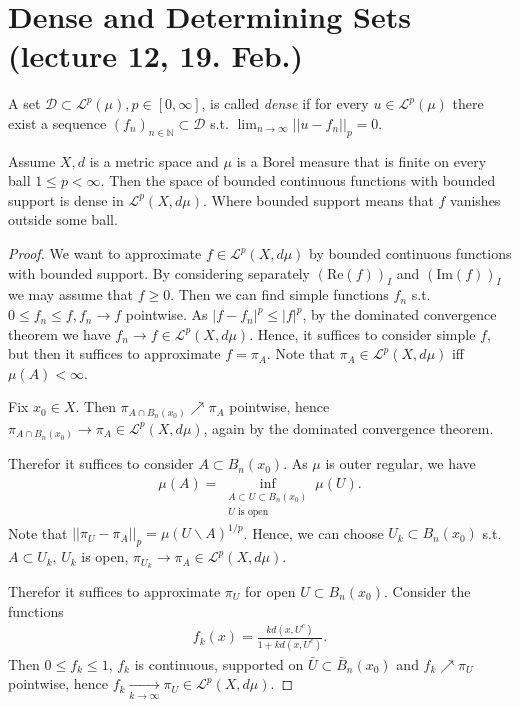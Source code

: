 \section{Dense and Determining Sets (lecture 12, 19. Feb.)}
\begin{definition}
    A set \(\mathcal{D}\subset\mathcal{L}^p(\mu), p\in[0,\infty]\), is called \emph{dense} if for every \(u\in\mathcal{L}^p(\mu)\) there exist
    a sequence \((f_n)_{n\in\mathbb{N}}\subset\mathcal{D}\) s.t. \(\lim_{n\rightarrow\infty}\vert\vert u-f_n\vert\vert_p=0\).
\end{definition}
\begin{theorem}
    Assume \(X,d\) is a metric space and \(\mu\) is a Borel measure that is finite on every ball \(1\leq p<\infty\). Then the space of 
    bounded continuous functions with bounded support is dense in \(\mathcal{L}^p(X,d\mu)\). Where bounded support means that \(f\) vanishes outside
    some ball.
\end{theorem}
\ifdetailed
\begin{proof}
    We want to approximate \(f\in\mathcal{L}^p(X,d\mu)\) by bounded continuous functions with bounded support. By considering separately 
    \((\text{Re}(f))_I\) and \((\text{Im}(f))_I\) we may assume that \(f\geq 0\). Then we can find simple functions \(f_n\) s.t. 
    \(0\leq f_n\leq f, f_n\rightarrow f\) pointwise. As \(\vert  f- f_n\vert^p \leq \vert f\vert^p\), by the dominated convergence theorem
    we have \(f_n\rightarrow f\in\mathcal{L}^p(X,d\mu)\). Hence, it suffices to consider simple \(f\), but then it suffices to approximate
    \(f=\pi_A\). Note that \(\pi_A\in\mathcal{L}^p(X,d\mu)\) iff \(\mu(A)<\infty\). 

    Fix \(x_0\in X\). Then \(\pi_{A\cap B_n(x_0)} \nearrow \pi_A\) pointwise, hence 
    \(\pi_{A\cap B_n(x_0)}\rightarrow \pi_A\in\mathcal{L}^p(X,d\mu)\), again by the dominated convergence theorem. 

    Therefor it suffices to consider \(A\subset B_n(x_0)\). As \(\mu\) is outer regular, we have 
    \begin{align*}
        \mu(A) = \inf_{\substack{A\subset U\subset B_n(x_0) \\ U \text{ is open}}} \mu(U).
    \end{align*}
    Note that \(\vert\vert \pi_U - \pi_A\vert\vert_p = \mu(U\backslash A)^{1/p}\). Hence, we can choose \(U_k\subset B_n(x_0)\) s.t.
    \(A\subset U_k\), \(U_k\) is open, \(\pi_{U_k}\rightarrow \pi_A\in\mathcal{L}^p(X,d\mu)\).

    Therefor it suffices to approximate \(\pi_U\) for open \(U\subset B_n(x_0)\). Consider the functions
    \begin{align*}
        f_k(x) = \frac{kd(x,U^c)}{1+kd(x,U^c)}.
    \end{align*}
    Then \(0\leq f_k\leq 1\), \(f_k\) is continuous, supported on \(\bar{U} \subset \bar{B}_n(x_0)\) and \(f_k\nearrow\pi_U\) pointwise, hence
    \(f_k\xrightarrow[k\rightarrow \infty]{ } \pi_U\in\mathcal{L}^p(X,d\mu)\).
\end{proof}
